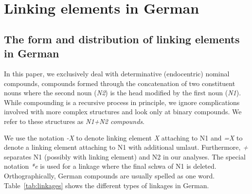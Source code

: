\section{Linking elements in German}
\label{sec:linkingelementsingerman}

\subsection{The form and distribution of linking elements in German}
\label{sec:theformanddistributionoflinkingelementsingerman}

In this paper, we exclusively deal with determinative (endocentric) nominal compounds, \ie compounds formed through the concatenation of two constituent nouns where the second noun (\textit{N2}) is the head modified by the first noun (\textit{N1}).
While compounding is a recursive process in principle, we ignore complications involved with more complex structures and look only at binary compounds.
We refer to these structures as \textit{N1+N2 compounds}.


We use the notation \textit{-X} to denote linking element \textit{X} attaching to N1 and \textit{=X} to denote a linking element attaching to N1 with additional umlaut.
Furthermore, \textit{+} separates N1 (possibly with linking element) and N2 in our analyses.
The special notation \textit{*e} is used for a linkage where the final schwa of N1 is deleted.
Orthographically, German compounds are usually spelled as one word.
Table~\ref{tab:linkages} shows the different types of linkages in German.

